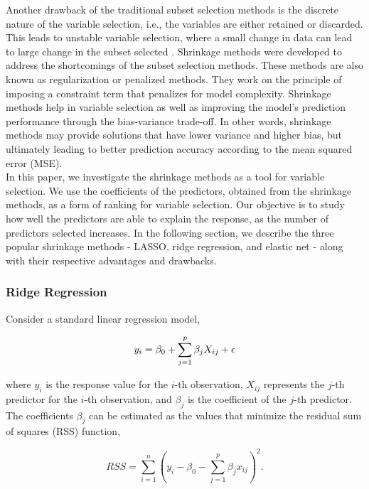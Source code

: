 Another drawback of the  traditional subset selection methods is the discrete nature of the variable selection, i.e., the variables are either retained or discarded. This leads to unstable variable selection, where a small change in data can lead to large change in the subset selected \cite{breiman_heuristics_1996}. Shrinkage methods were developed to address the shortcomings of the subset selection methods. These methods are also known as regularization or penalized methods. They work on the principle of imposing a constraint term that penalizes for model complexity. Shrinkage methods help in variable selection as well as improving the model's prediction performance through the bias-variance trade-off. In other words, shrinkage methods may provide solutions that have lower variance and higher bias, but ultimately leading to better prediction accuracy according to the mean squared error (MSE). \\

In this paper, we investigate the shrinkage methods as a tool for variable selection. We use the coefficients of the predictors, obtained from the shrinkage methods, as a form of ranking for variable selection. Our objective is to study how well the predictors are able to explain the response, as the number of predictors selected increases. In the following section, we describe the three popular shrinkage methods - LASSO, ridge regression, and elastic net  - along with their respective advantages and drawbacks. \\

\subsubsection{Ridge Regression}

Consider a standard linear regression model, 

\begin{equation}
y_i = \beta_0 + \sum_{j = 1}^p \beta_j X_{ij} + \epsilon \notag
\end{equation}

\noindent where $y_i$ is the response value for the $i$-th observation, $X_{ij}$ represents the $j$-th predictor for the $i$-th observation, and $\beta_j$ is the coefficient of the $j$-th predictor. The coefficients $\beta_j$ can be estimated as the values that minimize the residual sum of squares (RSS) function, 

\begin{equation}
RSS = \sum_{i = 1}^n \left( y_i - \beta_0 - \sum_{j = 1}^p \beta_j x_{ij} \right)^2.
\end{equation}

